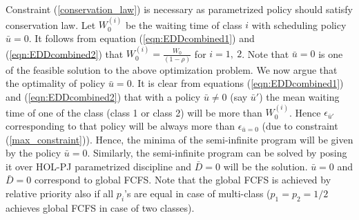 \documentclass[letterpaper, 10 pt, conference]{ieeeconf}  %
\begin{document}
Constraint (\ref{conservation_law}) is necessary as parametrized policy should satisfy conservation law. Let $W_0^{(i)}$ be the waiting time of class $i$ with scheduling policy $\bar{u} = 0$. It follows from equation (\ref{eqn:EDDcombined1}) and (\ref{eqn:EDDcombined2}) that $W_0^{(i)} = \frac{W_0}{(1-\rho)}$ for $i=1,~2$. Note that $\bar{u} = 0$ is one of the feasible solution to the above optimization problem. We now argue that the optimality of policy $\bar{u}=0$. It is clear from equations (\ref{eqn:EDDcombined1}) and (\ref{eqn:EDDcombined2}) that with a policy $\bar{u} \neq 0$ (say $\bar{u}'$) the mean waiting time of one of the class (class 1 or class 2) will be more than $W_{0}^{(i)}$. Hence $\epsilon_{\bar{u}'}$ corresponding to that policy will be always more than $\epsilon_{\bar{u} = 0}$ (due to constraint (\ref{max_constraint})). Hence, the minima of the semi-infinite program will be given by the policy $\bar{u} = 0$. Similarly, the semi-infinite program can be solved by posing it over HOL-PJ parametrized discipline and $\bar{D}=0$ will be the solution. $\bar{u} = 0$ and $\bar{D} =0 $ correspond to global FCFS. Note that the global FCFS is achieved by relative priority also if all $p_i$'s are equal in case of multi-class ($p_1 = p_2 = 1/2$ achieves global FCFS in case of two classes).




\end{document}
